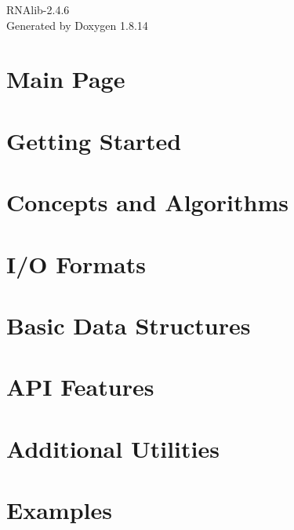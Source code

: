 \documentclass[twoside]{book}
\newcommand{\+}{\discretionary{\mbox{\scriptsize$\hookleftarrow$}}{}{}}
\newcommand{\clearemptydoublepage}{%
  \newpage{\pagestyle{empty}\cleardoublepage}%
}
\begin{document}
\hypersetup{pageanchor=false,
             bookmarksnumbered=true,
             pdfencoding=unicode
            }
\begin{titlepage}
\vspace*{7cm}
\begin{center}%
{\Large R\+N\+Alib-\/2.4.6 }\\
\vspace*{1cm}
{\large Generated by Doxygen 1.8.14}\\
\end{center}
\end{titlepage}
\clearemptydoublepage
{}
\tableofcontents
\clearemptydoublepage
{}
\hypersetup{pageanchor=true}

\chapter{Main Page}
\label{index}\hypertarget{index}{}
\chapter{Getting Started}
\label{getting_started}

\chapter{Concepts and Algorithms}
\label{concepts}

\chapter{I/O Formats}
\label{io}

\chapter{Basic Data Structures}
\label{data_structures}

\chapter{A\+PI Features}
\label{api_features}

\chapter{Additional Utilities}
\label{utilities}

\chapter{Examples}
\label{examples}

\end{document}
